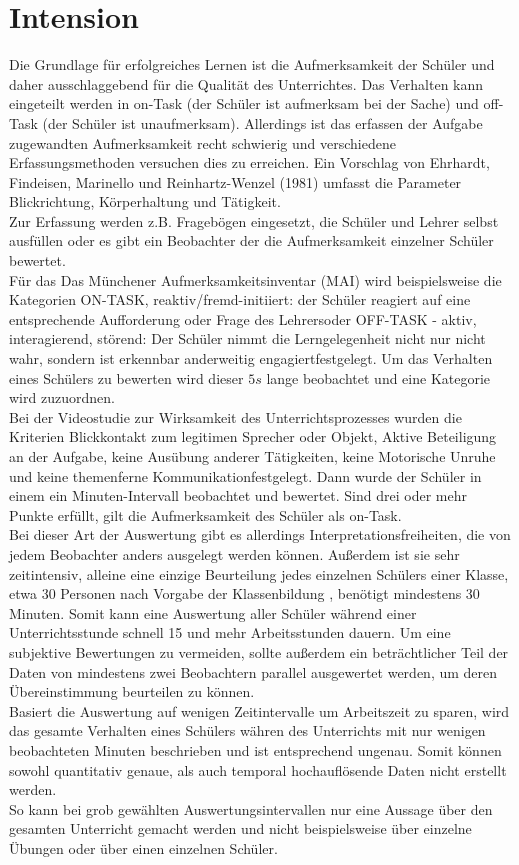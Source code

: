 \section{Intension}
\label{intension}
Die Grundlage für erfolgreiches Lernen ist die Aufmerksamkeit der Schüler und  daher ausschlaggebend für die Qualität des Unterrichtes. Das Verhalten kann eingeteilt werden in on-Task (der Schüler ist aufmerksam bei der Sache) und off-Task (der Schüler ist unaufmerksam). Allerdings ist das erfassen der Aufgabe zugewandten Aufmerksamkeit recht schwierig und verschiedene Erfassungsmethoden versuchen dies zu erreichen. Ein Vorschlag von Ehrhardt, Findeisen, Marinello und Reinhartz-Wenzel (1981) umfasst die Parameter Blickrichtung, Körperhaltung und Tätigkeit.\\
Zur Erfassung werden z.B. Fragebögen eingesetzt, die Schüler und Lehrer selbst ausfüllen oder es gibt ein Beobachter der die Aufmerksamkeit einzelner Schüler bewertet.\\
Für das \glqq Das Münchener Aufmerksamkeitsinventar (MAI)\grqq \cite{MAI_Verhaltensbeobachtung} wird beispielsweise die Kategorien \glqq ON-TASK, reaktiv/fremd-initiiert: der Schüler reagiert auf eine entsprechende Aufforderung oder Frage des Lehrers\grqq oder \glqq OFF-TASK - aktiv, interagierend, störend: Der Schüler nimmt die Lerngelegenheit nicht nur nicht wahr, sondern ist erkennbar anderweitig engagiert\grqq festgelegt. Um das Verhalten eines Schülers zu bewerten wird dieser $5s$ lange beobachtet und eine Kategorie wird zuzuordnen.\\
Bei der \glqq Videostudie zur Wirksamkeit des Unterrichtsprozesses \grqq \cite{aufmerksamkeit_Studie} wurden die Kriterien \glqq Blickkontakt zum legitimen Sprecher oder Objekt, Aktive Beteiligung an der Aufgabe, keine Ausübung anderer Tätigkeiten, keine Motorische Unruhe und keine themenferne Kommunikation\grqq festgelegt. Dann wurde der Schüler in einem ein Minuten-Intervall beobachtet und bewertet. Sind drei oder mehr Punkte erfüllt, gilt die Aufmerksamkeit des Schüler als on-Task.\\
Bei dieser Art der Auswertung gibt es allerdings Interpretationsfreiheiten, die von jedem Beobachter anders ausgelegt werden können. Außerdem ist sie sehr zeitintensiv, alleine eine einzige Beurteilung jedes einzelnen Schülers einer Klasse, etwa 30 Personen nach Vorgabe der Klassenbildung \cite{klassenteiler}, benötigt mindestens 30 Minuten. Somit kann eine Auswertung aller Schüler während einer Unterrichtsstunde schnell 15 und mehr Arbeitsstunden dauern. Um eine subjektive Bewertungen zu vermeiden, sollte außerdem ein beträchtlicher Teil der Daten von mindestens zwei Beobachtern parallel ausgewertet werden, um deren Übereinstimmung beurteilen zu können.\\
Basiert die Auswertung auf wenigen Zeitintervalle um Arbeitszeit zu sparen, wird das gesamte Verhalten eines Schülers währen des Unterrichts mit nur wenigen beobachteten Minuten beschrieben und ist entsprechend ungenau. Somit können sowohl quantitativ genaue, als auch temporal hochauflösende Daten nicht erstellt werden.\\
So kann bei grob gewählten Auswertungsintervallen nur eine Aussage über den gesamten Unterricht gemacht werden und nicht beispielsweise über einzelne Übungen oder über einen einzelnen Schüler.